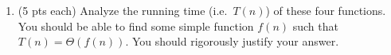 \documentclass[14pt]{extarticle}
\newcommand\tab[1][1cm]{\hspace*{#1}}
\begin{document}
\begin{enumerate}
\item (5 pts each) Analyze the running time (i.e.~$T(n)$) of these four functions. You should be able to find some simple function $f(n)$ such that $T(n) = \Theta(f(n))$. You should rigorously justify your answer.
\begin{enumerate}


\end{enumerate}





\end{enumerate}
\end{document}
